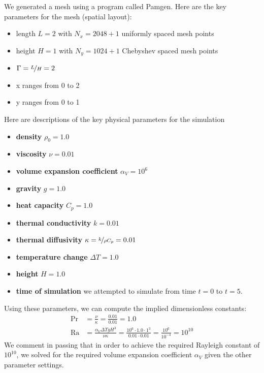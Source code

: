 \documentclass[11pt]{article} %
\begin{document}
We generated a mesh using a program called Pamgen.  Here are the key parameters for the mesh (spatial layout):
\begin{itemize}
\item{length} $L=2$  with $N_x = 2048 + 1$ uniformly spaced mesh points
\item{height} $H=1$ with $N_y = 1024 + 1$ Chebyshev spaced mesh points
\item{$\Gamma = \nicefrac{L}{H} = 2$}
\item{x} ranges from 0 to 2
\item{y} ranges from 0 to 1
\end{itemize}

Here are descriptions of the key physical parameters for the simulation
\begin{itemize}
\item{\textbf{density}} $\rho_0 = 1.0$
\item{\textbf{viscosity}} $\nu = 0.01$
\item{\textbf{volume expansion coefficient}} $\alpha_V = 10^6$
\item{\textbf{gravity}} $g = 1.0$
\item{\textbf{heat capacity}} $C_p = 1.0$
\item{\textbf{thermal conductivity}} $k = 0.01$
\item{\textbf{thermal diffusivity}} $\kappa = \nicefrac{k}{\rho C_p} = 0.01$
\item{\textbf{temperature change}} $\Delta T = 1.0$ 
\item{\textbf{height}} $H = 1.0$
\item{\textbf{time of simulation}} we attempted to simulate from time $t=0$ to $t=5$.
\end{itemize}

Using these parameters, we can compute the implied dimensionless constants:
\begin{align}
\textrm{Pr} &= \frac{\nu}{\kappa} = \frac{0.01}{0.01} = 1.0 \\
\textrm{Ra} &= \frac{\alpha_V \Delta T g H^3}{\nu \kappa} = \frac{10^{6} \cdot 1.0 \cdot 1^3}{0.01 \cdot 0.01} = \frac{10^{6}}{10^{-4}} = 10^{10}
\end{align}
We comment in passing that in order to achieve the required Rayleigh constant of $10^{10}$, 
we solved for the required volume expansion coefficient $\alpha_V$ given the other parameter settings.
\end{document}
